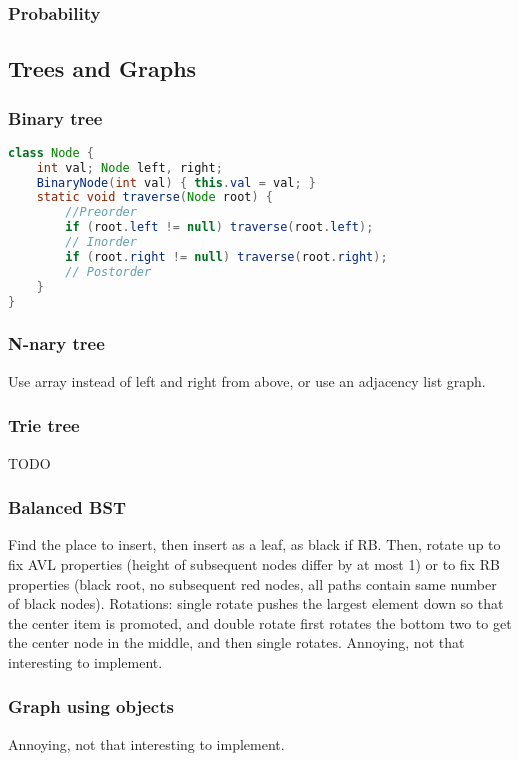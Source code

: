 \documentclass[10pt]{article}
\begin{document}
\subsubsection{Probability}

\subsection{Trees and Graphs}
\subsubsection{Binary tree}
\begin{lstlisting}[language=java]
class Node {
    int val; Node left, right;
    BinaryNode(int val) { this.val = val; }
    static void traverse(Node root) {
        //Preorder
        if (root.left != null) traverse(root.left);
        // Inorder
        if (root.right != null) traverse(root.right);
        // Postorder
    }
}
\end{lstlisting}
\subsubsection{N-nary tree}
Use array instead of left and right from above, or use an adjacency list graph.
\subsubsection{Trie tree}
TODO
\subsubsection{Balanced BST}
Find the place to insert, then insert as a leaf, as black if RB. Then, rotate up to fix AVL properties (height of subsequent nodes differ by at most 1) or to fix RB properties (black root, no subsequent red nodes, all paths contain same number of black nodes). Rotations: single rotate pushes the largest element down so that the center item is promoted, and double rotate first rotates the bottom two to get the center node in the middle, and then single rotates. Annoying, not that interesting to implement.
\subsubsection{Graph using objects}
Annoying, not that interesting to implement.
\end{document}
